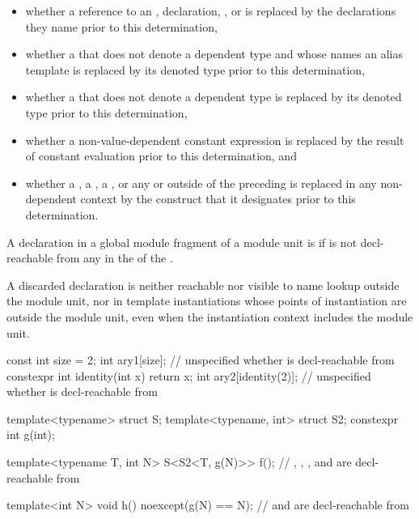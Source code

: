 \begin{itemize}
\item
whether a reference to an
,
 declaration,
, or
is replaced by the declarations they name
prior to this determination,

\item
whether a 
that does not denote a dependent type
and whose  names an alias template
is replaced by its denoted type
prior to this determination,

\item
whether a 
that does not denote a dependent type
is replaced by its denoted type
prior to this determination,

\item
whether a non-value-dependent constant expression
is replaced by the result of constant evaluation
prior to this determination,
and

\item
whether
a ,
a ,
a , or
any  or
outside of the preceding is replaced in any non-dependent context
by the construct that it designates prior to this determination.
\end{itemize}

\pnum
A declaration  in a global module fragment of a module unit
is  if 
is not decl-reachable from any 
in the 
of the .
\begin{note}
A discarded declaration is neither reachable
nor visible to name lookup outside the module unit,
nor in template instantiations whose points of instantiation
are outside the module unit,
even when the instantiation context
includes the module unit.
\end{note}

\pnum
\begin{example}
\begin{codeblock}
const int size = 2;
int ary1[size];                 // unspecified whether  is decl-reachable from 
constexpr int identity(int x) { return x; }
int ary2[identity(2)];          // unspecified whether  is decl-reachable from 

template<typename> struct S;
template<typename, int> struct S2;
constexpr int g(int);

template<typename T, int N>
S<S2<T, g(N)>> f();             // , , , and \tcode{::} are decl-reachable from 

template<int N>
void h() noexcept(g(N) == N);   //  and \tcode{::} are decl-reachable from 
\end{codeblock}
\end{example}

